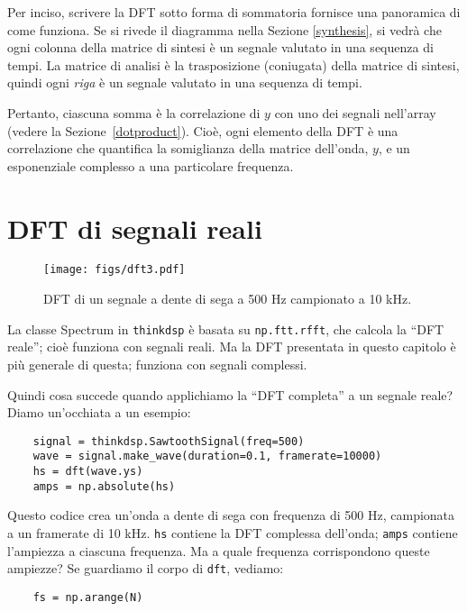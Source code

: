 \documentclass[12pt,a4paper]{book}
\begin{document}
Per inciso, scrivere la DFT sotto forma di sommatoria fornisce una panoramica di come funziona. Se si rivede il diagramma nella Sezione \ref{synthesis}, si vedrà che ogni colonna della matrice di sintesi è un segnale valutato in una sequenza di tempi. La matrice di analisi è la trasposizione (coniugata) della matrice di sintesi, quindi ogni {\em riga} è un segnale valutato in una sequenza di tempi.

Pertanto, ciascuna somma è la correlazione di $y$ con uno dei segnali nell'array (vedere la Sezione~\ref{dotproduct}). Cioè, ogni elemento della DFT è una correlazione che quantifica la somiglianza della matrice dell'onda, $y$, e un esponenziale complesso a una particolare frequenza.

\section{DFT di segnali reali} 

\begin{figure} 

\centerline{\texttt{[image: figs/dft3.pdf]}} \caption{DFT di un segnale a dente di sega a 500 Hz campionato a 10 kHz.} \label{fig.dft3} \end{figure} 

La classe Spectrum in {\tt thinkdsp} è basata su {\tt np.ftt.rfft}, che calcola la ``DFT reale''; cioè funziona con segnali reali. Ma la DFT presentata in questo capitolo è più generale di questa; funziona con segnali complessi.

Quindi cosa succede quando applichiamo la ``DFT completa'' a un segnale reale? Diamo un'occhiata a un esempio:

\begin{verbatim} 
    signal = thinkdsp.SawtoothSignal(freq=500)
    wave = signal.make_wave(duration=0.1, framerate=10000)
    hs = dft(wave.ys)
    amps = np.absolute(hs)
 \end{verbatim} 

Questo codice crea un'onda a dente di sega con frequenza di 500 Hz, campionata a un framerate di 10 kHz. {\tt hs} contiene la DFT complessa dell'onda; {\tt amps} contiene l'ampiezza a ciascuna frequenza. Ma a quale frequenza corrispondono queste ampiezze? Se guardiamo il corpo di {\tt dft}, vediamo:

\begin{verbatim} 
    fs = np.arange(N)
 \end{verbatim} 
\end{document}
